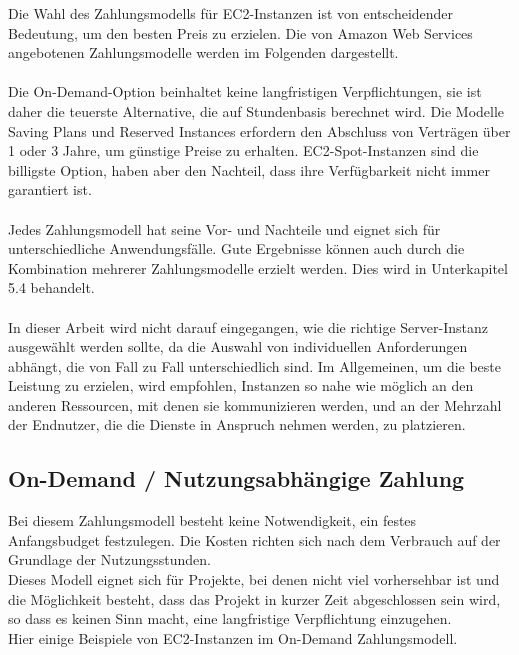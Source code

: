 Die Wahl des Zahlungsmodells für EC2-Instanzen ist von entscheidender Bedeutung, um den besten Preis zu erzielen.
Die von Amazon Web Services angebotenen Zahlungsmodelle werden im Folgenden dargestellt.
\\\\
Die On-Demand-Option %
beinhaltet keine langfristigen Verpflichtungen, sie ist daher die teuerste Alternative, die auf Stundenbasis berechnet wird. Die Modelle Saving Plans und Reserved Instances erfordern den Abschluss von Verträgen über 1 oder 3 Jahre, um günstige Preise zu erhalten. EC2-Spot-Instanzen sind die billigste Option, haben aber den Nachteil, dass ihre Verfügbarkeit nicht immer garantiert ist.
\\\\
Jedes Zahlungsmodell hat seine Vor- und Nachteile und eignet sich für unterschiedliche Anwendungsfälle. Gute Ergebnisse können auch durch die Kombination mehrerer Zahlungsmodelle erzielt werden. Dies wird in Unterkapitel 5.4 behandelt.
\\\\
In dieser Arbeit wird nicht darauf eingegangen, wie die richtige Server-Instanz ausgewählt werden sollte, da die Auswahl von individuellen Anforderungen abhängt, die von Fall zu Fall unterschiedlich sind. Im Allgemeinen, um die beste Leistung zu erzielen, wird empfohlen, Instanzen so nahe wie möglich an den anderen Ressourcen, mit denen sie kommunizieren werden, und an der Mehrzahl der Endnutzer, die die Dienste in Anspruch nehmen werden, zu platzieren.


\subsection{On-Demand / Nutzungsabhängige Zahlung}
Bei diesem Zahlungsmodell besteht keine Notwendigkeit, ein festes Anfangsbudget festzulegen. Die Kosten richten sich nach dem Verbrauch auf der Grundlage der Nutzungsstunden.
\\
Dieses Modell eignet sich für Projekte, bei denen nicht viel vorhersehbar ist und die Möglichkeit besteht, dass das Projekt in kurzer Zeit abgeschlossen sein wird, so dass es keinen Sinn macht, eine langfristige Verpflichtung einzugehen.
\\
Hier einige Beispiele von EC2-Instanzen im On-Demand Zahlungsmodell.

